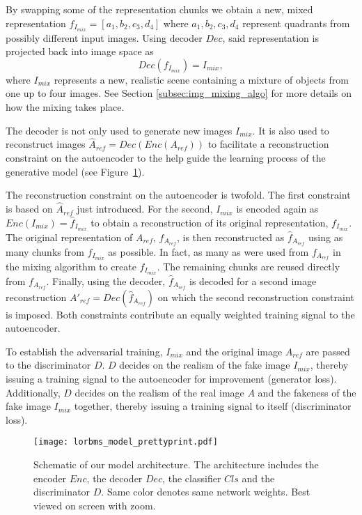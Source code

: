\documentclass[a4paper,12pt]{report}
\begin{document}
By swapping some of the representation chunks we obtain a new, mixed representation $f_{I_{mix}} = [a_1, b_2, c_3, d_4]$ where $a_1,b_2,c_3,d_4$ represent quadrants from possibly different input images. Using decoder $Dec$, said representation is projected back into image space as
\begin{equation} \label{eq:3}
    Dec(f_{I_{mix}}) = I_{mix},
\end{equation}
where $I_{mix}$ represents a new, realistic scene containing a mixture of objects from one up to four images. See Section \ref{subsec:img_mixing_algo} for more details on how the mixing takes place.

The decoder is not only used to generate new images $I_{mix}$. It is also used to reconstruct images $\hat{A}_{ref} = Dec(Enc(A_{ref}))$ to facilitate a reconstruction constraint on the autoencoder to the help guide the learning process of the generative model (see Figure~\ref{fig:model_arch}).

The reconstruction constraint on the autoencoder is twofold. The first constraint is based on $\hat{A}_{ref}$ just introduced. For the second, $I_{mix}$ is encoded again as $Enc(I_{mix}) = \hat{f}_{I_{mix}}$ to obtain a reconstruction of its original representation, $f_{I_{mix}}$. The original representation of $A_{ref}$, $f_{A_{ref}}$, is then reconstructed as $\hat{f}_{A_{ref}}$ using as many chunks from $\hat{f}_{I_{mix}}$ as possible. In fact, as many as were used from $f_{A_{ref}}$ in the mixing algorithm to create $f_{I_{mix}}$. The remaining chunks are reused directly from $f_{A_{ref}}$. Finally, using the decoder, $\hat{f}_{A_{ref}}$ is decoded for a second image reconstruction $A'_{ref} = Dec(\hat{f}_{A_{ref}})$ on which the second reconstruction constraint is imposed. Both constraints contribute an equally weighted training signal to the autoencoder.

To establish the adversarial training, $I_{mix}$ and the original image $A_{ref}$ are passed to the discriminator $D$. $D$ decides on the realism of the fake image $I_{mix}$, thereby issuing a training signal to the autoencoder for improvement (generator loss). Additionally, $D$ decides on the realism of the real image $A$ and the fakeness of the fake image $I_{mix}$ together, thereby issuing a training signal to itself (discriminator loss).

\begin{figure}[ht]
\centering
%
\texttt{[image: lorbms\_model\_prettyprint.pdf]}
\caption[Schematic of our model architecture.]{Schematic of our model architecture. The architecture includes the encoder $Enc$, the decoder $Dec$, the classifier $Cls$ and the discriminator $D$. Same color denotes same network weights. Best viewed on screen with zoom.}
\label{fig:model_arch}
\end{figure}
\end{document}

